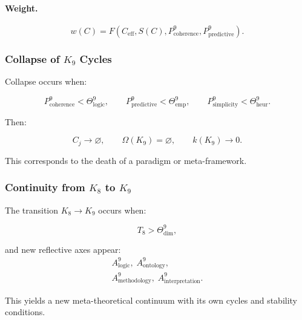 \paragraph{Weight.}
\[
  w(C) = F(C_{\mathrm{eff}}, S(C),
          P^9_{\mathrm{coherence}},
          P^9_{\mathrm{predictive}}).
\]


\subsubsection{Collapse of \texorpdfstring{$K_9$}{K_9} Cycles}

Collapse occurs when:

\[
  P^9_{\mathrm{coherence}} < \Theta^9_{\mathrm{logic}},\qquad
  P^9_{\mathrm{predictive}} < \Theta^9_{\mathrm{emp}},\qquad
  P^9_{\mathrm{simplicity}} < \Theta^9_{\mathrm{heur}}.
\]

Then:

\[
  C_j \to \varnothing,\qquad
  \Omega(K_9)=\varnothing,\qquad
  k(K_9)\to 0.
\]

This corresponds to the death of a paradigm or meta-framework.


\subsubsection{Continuity from \texorpdfstring{$K_8$}{K_8} to \texorpdfstring{$K_9$}{K_9}}

The transition $K_8\to K_9$ occurs when:

\[
  T_8 > \Theta^9_{\mathrm{dim}},
\]

and new reflective axes appear:
\[
  \begin{aligned}
  A^9_{\mathrm{logic}},\;
  A^9_{\mathrm{ontology}},\\
  A^9_{\mathrm{methodology}},\;
  A^9_{\mathrm{interpretation}}.
  \end{aligned}
\]

This yields a new meta-theoretical continuum with its own cycles and stability
conditions.
